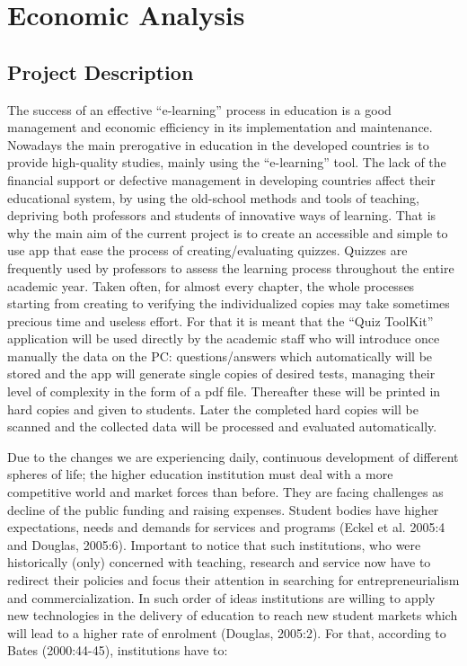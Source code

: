 \section{Economic Analysis}

\subsection{Project Description}
The success of an effective “e-learning” process in education is a good management and economic efficiency in its implementation and maintenance. Nowadays the main prerogative in education in the developed countries is to provide high-quality studies, mainly using the “e-learning” tool. The lack of the financial support or defective management in developing countries affect their educational system, by using the old-school methods and tools of teaching, depriving both professors and students of innovative ways of learning.  That is why the main aim of the current project is to create an accessible and simple to use app that ease the process of creating/evaluating quizzes. Quizzes are frequently used by professors to assess the learning process throughout the entire academic year. Taken often, for almost every chapter, the whole processes starting from creating to verifying the individualized copies may take sometimes precious time and useless effort. For that it is meant that the “Quiz ToolKit” application will be used directly by the academic staff who will introduce once manually the data on the PC: questions/answers which automatically will be stored and the app will generate single copies of desired tests, managing their level of complexity in the form of a pdf file. Thereafter these will be printed in hard copies and given to students. Later the completed hard copies will be scanned and the collected data will be processed and evaluated automatically. 

Due to the changes we are experiencing daily, continuous development of different spheres of life; the higher education institution must deal with a more competitive world and market forces than before. They are facing challenges as decline of the public funding and raising expenses. Student bodies have higher expectations, needs and demands for services and programs (Eckel et al. 2005:4 and Douglas, 2005:6). Important to notice that such institutions, who were historically (only) concerned with teaching, research and service now have to redirect their policies and focus their attention in searching for entrepreneurialism and commercialization. In such order of ideas institutions are willing to apply new technologies in the delivery of education to reach new student markets which will lead to a higher rate of enrolment (Douglas, 2005:2). For that, according to Bates (2000:44-45), institutions have to:

